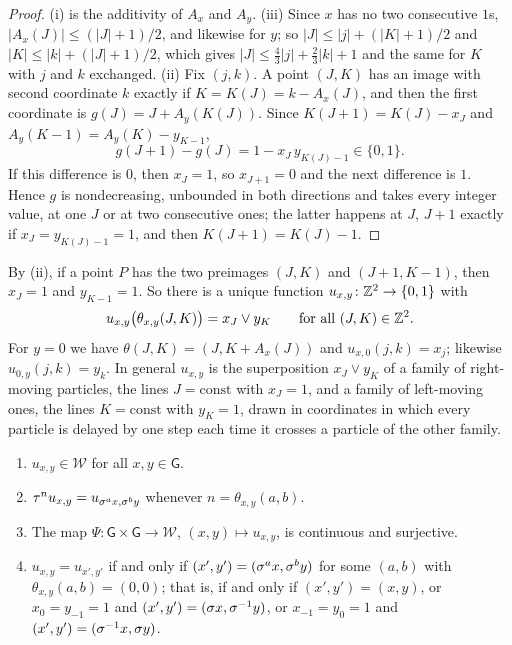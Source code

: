 \begin{proof}
(i) is the additivity of $A_x$ and $A_y$. (iii) Since $x$ has no two consecutive $1$s, $|A_x(J)|\le(|J|+1)/2$, and likewise for $y$; so $|J|\le|j|+(|K|+1)/2$ and $|K|\le|k|+(|J|+1)/2$, which gives $|J|\le\frac43|j|+\frac23|k|+1$ and the same for $K$ with $j$ and $k$ exchanged. (ii) Fix $(j,k)$. A point $(J,K)$ has an image with second coordinate $k$ exactly if $K=K(J)=k-A_x(J)$, and then the first coordinate is $g(J)=J+A_y(K(J))$. Since $K(J+1)=K(J)-x_J$ and $A_y(K-1)=A_y(K)-y_{K-1}$,
\[
g(J+1)-g(J)=1-x_J\,y_{K(J)-1}\in\{0,1\}.
\]
If this difference is $0$, then $x_J=1$, so $x_{J+1}=0$ and the next difference is $1$. Hence $g$ is nondecreasing, unbounded in both directions and takes every integer value, at one $J$ or at two consecutive ones; the latter happens at $J$, $J+1$ exactly if $x_J=y_{K(J)-1}=1$, and then $K(J+1)=K(J)-1$.
\end{proof}

By (ii), if a point $P$ has the two preimages $(J,K)$ and $(J+1,K-1)$, then $x_J=1$ and $y_{K-1}=1$. So there is a unique function $u_{x,y}\colon\mathbb{Z}^2\to\{0,1\}$ with
\begin{equation}\label{cl:eq:uxy}
u_{x,y}\bigl(\theta_{x,y}(J,K)\bigr)=x_J\vee y_K\qquad\text{for all }(J,K)\in\mathbb{Z}^2 .
\end{equation}
For $y=0$ we have $\theta(J,K)=(J,K+A_x(J))$ and $u_{x,0}(j,k)=x_j$; likewise $u_{0,y}(j,k)=y_k$. In general $u_{x,y}$ is the superposition $x_J\vee y_K$ of a family of right-moving particles, the lines $J=\mathrm{const}$ with $x_J=1$, and a family of left-moving ones, the lines $K=\mathrm{const}$ with $y_K=1$, drawn in coordinates in which every particle is delayed by one step each time it crosses a particle of the other family.

\begin{theorem}\label{cl:thm:95sol}
\leavevmode
\begin{enumerate}
\item[(a)] $u_{x,y}\in\mathcal W$ for all $x,y\in \mathsf G$.
\item[(b)] $\tau^{n}u_{x,y}=u_{\sigma^ax,\sigma^by}$ whenever $n=\theta_{x,y}(a,b)$.
\item[(c)] The map $\Psi\colon \mathsf G\times \mathsf G\to\mathcal W$, $(x,y)\mapsto u_{x,y}$, is continuous and surjective.
\item[(d)] $u_{x,y}=u_{x',y'}$ if and only if $(x',y')=(\sigma^ax,\sigma^by)$ for some $(a,b)$ with $\theta_{x,y}(a,b)=(0,0)$; that is, if and only if $(x',y')=(x,y)$, or $x_0=y_{-1}=1$ and $(x',y')=(\sigma x,\sigma^{-1}y)$, or $x_{-1}=y_0=1$ and $(x',y')=(\sigma^{-1}x,\sigma y)$.
\end{enumerate}
\end{theorem}

